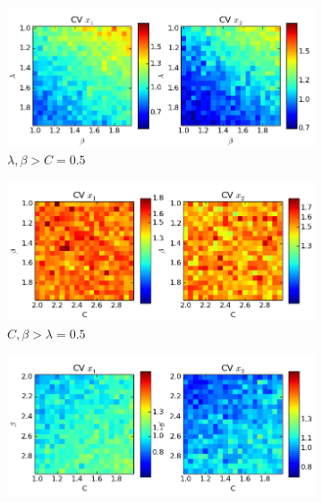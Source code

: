 \documentclass[a4paper,12pt]{article}
\begin{document}
\begin{figure}[!ht]
        \begin{subfigure}[b]{0.496\textwidth}
                \includegraphics[width=\textwidth]{images/vars2}
                \caption{$\lambda, \beta > C=0.5$}
                \label{fig:vars2}
        \end{subfigure}
          \newline
        \begin{subfigure}[b]{0.496\textwidth}
                \includegraphics[width=\textwidth]{images/vars3}
                \caption{$C, \beta > \lambda=0.5$}
                \label{fig:vars3}
        \end{subfigure}
        \begin{subfigure}[b]{0.496\textwidth}
                \includegraphics[width=\textwidth]{images/vars4}

\end{subfigure}
\end{figure}
\end{document}

